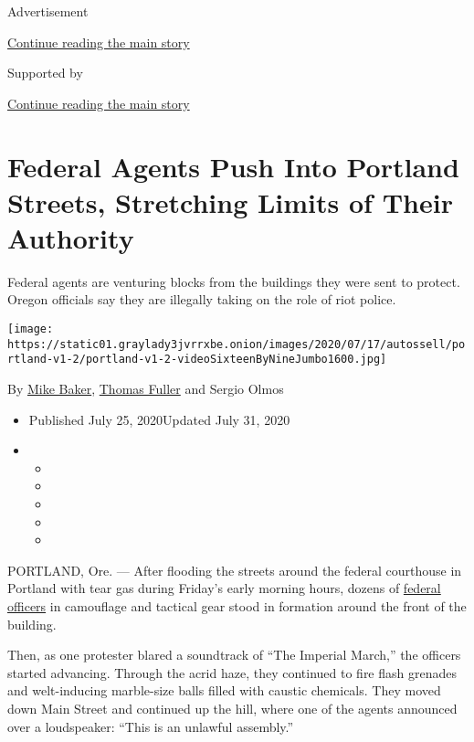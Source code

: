 Advertisement

\protect\hyperlink{after-top}{Continue reading the main story}

Supported by

\protect\hyperlink{after-sponsor}{Continue reading the main story}

\hypertarget{federal-agents-push-into-portland-streets-stretching-limits-of-their-authority}{%
\section{Federal Agents Push Into Portland Streets, Stretching Limits of
Their
Authority}\label{federal-agents-push-into-portland-streets-stretching-limits-of-their-authority}}

Federal agents are venturing blocks from the buildings they were sent to
protect. Oregon officials say they are illegally taking on the role of
riot police.

\texttt{[image: https://static01.graylady3jvrrxbe.onion/images/2020/07/17/autossell/portland-v1-2/portland-v1-2-videoSixteenByNineJumbo1600.jpg]}

By \href{https://www.nytimes3xbfgragh.onion/by/mike-baker}{Mike Baker},
\href{https://www.nytimes3xbfgragh.onion/by/thomas-fuller}{Thomas
Fuller} and Sergio Olmos

\begin{itemize}
\item
  Published July 25, 2020Updated July 31, 2020
\item
  \begin{itemize}
  \item
  \item
  \item
  \item
  \item
  \end{itemize}
\end{itemize}

PORTLAND, Ore. --- After flooding the streets around the federal
courthouse in Portland with tear gas during Friday's early morning
hours, dozens of
\href{https://www.nytimes3xbfgragh.onion/2020/07/30/nyregion/nypd-protester-van.html}{federal
officers} in camouflage and tactical gear stood in formation around the
front of the building.

Then, as one protester blared a soundtrack of ``The Imperial March,''
the officers started advancing. Through the acrid haze, they continued
to fire flash grenades and welt-inducing marble-size balls filled with
caustic chemicals. They moved down Main Street and continued up the
hill, where one of the agents announced over a loudspeaker: ``This is an
unlawful assembly.''


